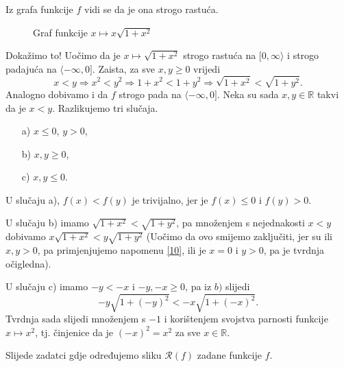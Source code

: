 \documentclass{book}
\renewenvironment{proof}{%
    \vspace{-\parskip}\begin{oldproof}%
    }{%
    \end{oldproof}%
}
\theoremstyle{definition}
\theoremstyle{definition}
\theoremstyle{remark}
\begin{document}
\begin{proof}[Rješenje]
Iz grafa funkcije $f$ vidi se da je ona strogo rastuća.
\begin{figure}[ht]
\begin{center}
\end{center}
\caption{\label{gr4} Graf funkcije $x\mapsto x\sqrt{1+x^2}$}
\end{figure}

Dokažimo to! Uočimo da je $x\mapsto \sqrt{1+x^2}$ strogo rastuća na $[0, \infty\rangle$ i strogo padajuća na $\langle-\infty, 0]$. Zaista, za sve $x, y\geq 0$ vrijedi
$$x<y\Rightarrow x^2<y^2\Rightarrow 1+x^2<1+y^2\Rightarrow \sqrt{1+x^2}<\sqrt{1+y^2}.$$
Analogno dobivamo i da $f$ strogo pada na $\langle-\infty, 0]$. Neka su sada $x, y\in \mathbb{R}$ takvi da je $x<y$. Razlikujemo tri slučaja.

\begin{itemize}
\item[a)] $x\leq 0$, $y>0$,
\item[b)] $x, y\geq 0$,
\item[c)] $x, y\leq 0$.
\end{itemize}

U slučaju a), $f(x)<f(y)$ je trivijalno, jer je $f(x)\leq 0$ i $f(y)>0$. 

U slučaju b) imamo $\sqrt{1+x^2}<\sqrt{1+y^2}$, pa množenjem s nejednakosti $x<y$ dobivamo $x\sqrt{1+x^2}<y\sqrt{1+y^2}$ (Uočimo da ovo smijemo zaključiti, jer su ili $x, y>0$, pa primjenjujemo napomenu \ref{10}, ili je $x=0$ i $y>0$, pa je tvrdnja očigledna).

U slučaju c) imamo $-y<-x$ i $-y, -x\geq 0$, pa iz $b)$ slijedi $$-y\sqrt{1+(-y)^2}<-x\sqrt{1+(-x)^2}.$$ Tvrdnja sada slijedi množenjem s $-1$ i korištenjem svojstva parnosti funkcije $x\mapsto x^2$, tj. činjenice da je $(-x)^2=x^2$ za sve $x\in \mathbb{R}$.
\end{proof}
Slijede zadatci gdje određujemo sliku $\mathcal{R}(f)$ zadane funkcije $f$.
\end{document}
